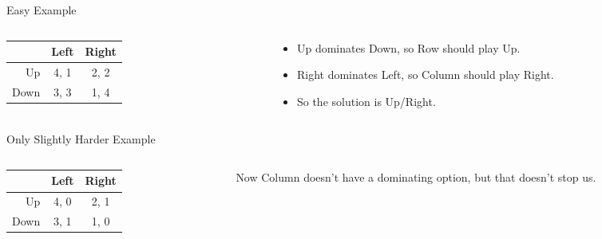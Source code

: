 \documentclass[
  14pt,
  letterpaper,
  ignorenonframetext,
  aspectratio=169,
]{beamer}
\providecommand{\tightlist}{%
  \setlength{\itemsep}{0pt}\setlength{\parskip}{0pt}}\usepackage{longtable,booktabs,array}
\let\olditem\item
\renewcommand{\item}{%
\olditem\vspace{6pt}}
\begin{document}
\begin{frame}{Easy Example}
\protect\hypertarget{easy-example-1}{}
\begin{columns}[T]
\begin{column}{0.4\textwidth}
\begin{table}[!h]
\centering
\begin{tabular}[t]{>{}r|cc}
\toprule
 & Left & Right\\
\midrule
Up & 4, 1 & 2, 2\\
Down & 3, 3 & 1, 4\\
\bottomrule
\end{tabular}
\end{table}
\end{column}

\begin{column}{0.6\textwidth}
\begin{itemize}[<+->]
\tightlist
\item
  Up dominates Down, so Row should play Up.
\item
  Right dominates Left, so Column should play Right.
\item
  So the solution is Up/Right.
\end{itemize}
\end{column}
\end{columns}
\end{frame}

\begin{frame}{Only Slightly Harder Example}
\protect\hypertarget{only-slightly-harder-example}{}
\begin{columns}[T]
\begin{column}{0.4\textwidth}
\begin{table}[!h]
\centering
\begin{tabular}[t]{>{}r|cc}
\toprule
 & Left & Right\\
\midrule
Up & 4, 0 & 2, 1\\
Down & 3, 1 & 1, 0\\
\bottomrule
\end{tabular}
\end{table}
\end{column}

\begin{column}{0.6\textwidth}
Now Column doesn't have a dominating option, but that doesn't stop us.
\end{column}
\end{columns}
\end{frame}
\end{document}
